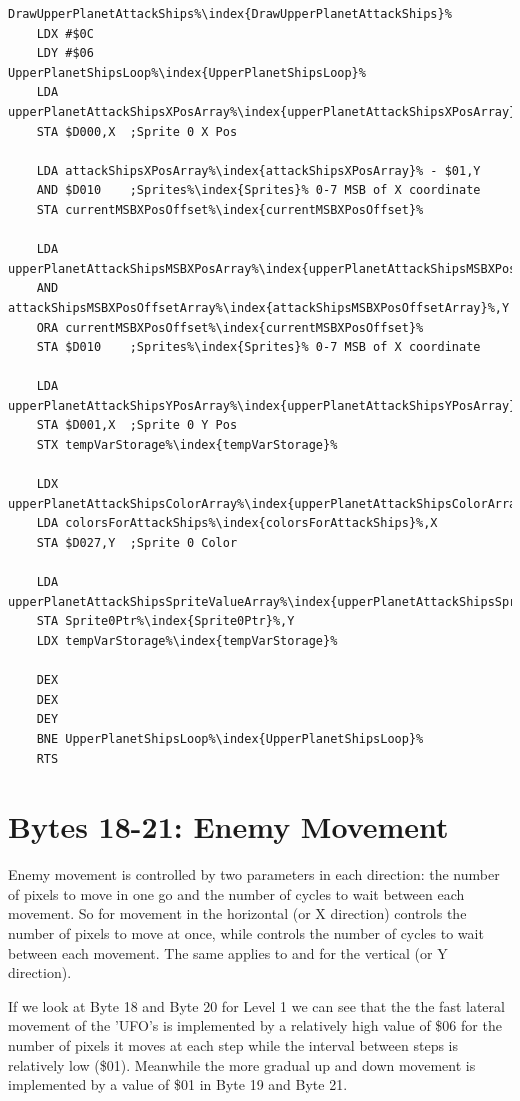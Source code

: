 \begin{lstlisting}[escapechar=\%]
DrawUpperPlanetAttackShips%\index{DrawUpperPlanetAttackShips}%
    LDX #$0C
    LDY #$06
UpperPlanetShipsLoop%\index{UpperPlanetShipsLoop}%   
    LDA upperPlanetAttackShipsXPosArray%\index{upperPlanetAttackShipsXPosArray}%,Y
    STA $D000,X  ;Sprite 0 X Pos

    LDA attackShipsXPosArray%\index{attackShipsXPosArray}% - $01,Y
    AND $D010    ;Sprites%\index{Sprites}% 0-7 MSB of X coordinate
    STA currentMSBXPosOffset%\index{currentMSBXPosOffset}%

    LDA upperPlanetAttackShipsMSBXPosArray%\index{upperPlanetAttackShipsMSBXPosArray}%,Y
    AND attackShipsMSBXPosOffsetArray%\index{attackShipsMSBXPosOffsetArray}%,Y
    ORA currentMSBXPosOffset%\index{currentMSBXPosOffset}%
    STA $D010    ;Sprites%\index{Sprites}% 0-7 MSB of X coordinate

    LDA upperPlanetAttackShipsYPosArray%\index{upperPlanetAttackShipsYPosArray}%,Y
    STA $D001,X  ;Sprite 0 Y Pos
    STX tempVarStorage%\index{tempVarStorage}%

    LDX upperPlanetAttackShipsColorArray%\index{upperPlanetAttackShipsColorArray}%,Y
    LDA colorsForAttackShips%\index{colorsForAttackShips}%,X
    STA $D027,Y  ;Sprite 0 Color

    LDA upperPlanetAttackShipsSpriteValueArray%\index{upperPlanetAttackShipsSpriteValueArray}%,Y
    STA Sprite0Ptr%\index{Sprite0Ptr}%,Y
    LDX tempVarStorage%\index{tempVarStorage}%

    DEX
    DEX
    DEY
    BNE UpperPlanetShipsLoop%\index{UpperPlanetShipsLoop}%
    RTS
\end{lstlisting}

\section{Bytes 18-21: Enemy Movement}

Enemy movement is controlled by two parameters in each direction: the number of pixels to move in one go and the number of
cycles to wait between each movement. So for movement in the horizontal (or X direction)  controls the number
of pixels to move at once, while  controls the number of cycles to wait between each movement. The same
applies to  and  for the vertical (or Y direction).

If we look at Byte 18 and Byte 20 for Level 1 we can see that the the fast lateral movement of the 'UFO's is implemented by a relatively
high value of \$06 for the number of pixels it moves at each step while the interval between steps is relatively low (\$01).
Meanwhile the more gradual up and down movement is implemented by a value of \$01 in Byte 19 and Byte 21.

